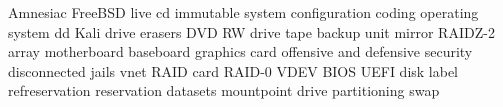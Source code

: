 Amnesiac
FreeBSD
live cd
immutable system
configuration
coding
operating system
dd
Kali
drive erasers
DVD RW drive
tape backup unit
mirror
RAIDZ-2 array
motherboard
baseboard
graphics card
offensive and defensive security
disconnected jails
vnet
RAID card
RAID-0
VDEV
BIOS
UEFI
disk label
refreservation
reservation
datasets
mountpoint
drive partitioning
swap
